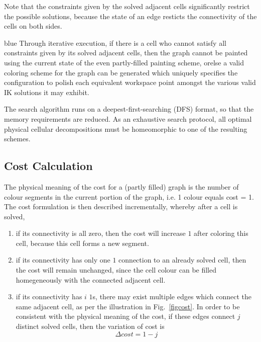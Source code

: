 \documentclass[journal]{IEEEtran}
\begin{document}
Note that the constraints given by the solved adjacent cells significantly restrict the possible solutions, 
because the state of an edge resticts the connectivity of the cells on both sides. 
\begin{color}{blue}
Through iterative execution, if there is a cell who cannot satisfy all constraints given by its solved adjacent cells, then the graph cannot be painted using the current state of the even partly-filled painting scheme, orelse a valid coloring scheme for the graph can be generated which uniquely specifies the configuration to polish each equivalent workspace point amongst the various valid IK solutions it may exhibit. 
\end{color}

The search algorithm runs on a deepest-first-searching (DFS) format, so that the memory requirements are reduced. 
As an exhaustive search protocol, all optimal physical cellular decompositions must be homeomorphic to one of the resulting schemes.

\subsection{Cost Calculation}
The physical meaning of the cost for a (partly filled) graph is the number of colour segments in the current portion of the graph, 
i.e. 1 colour equals cost = 1.
The cost formulation is then described incrementally, whereby after a cell is solved,  
\begin{enumerate}
\item if its connectivity is all zero, then the cost will increase $1$ after coloring this cell, because this cell forms a new segment.
\item if its connectivity has only one $1$ connection to an already solved cell, then the cost will remain unchanged, since the cell colour can be filled homegeneously with the connected adjacent cell. 
\item if its connectivity has $i$ $1$s, there may exist multiple edges which connect the same adjacent cell, as per the illustration 
in Fig.~\ref{figcost}. In order to be consistent with the physical meaning of the cost, 
if these edges connect $j$ distinct solved cells, then the variation of cost is 
\begin{equation}
\Delta cost = 1-j
\label{eq:cost}
\end{equation}
\end{enumerate}
\end{document}
